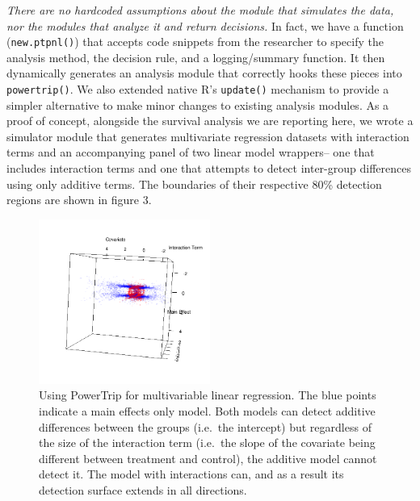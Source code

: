 \documentclass[review, authoryear]{elsarticle}
\begin{document}
\emph{There are no hardcoded assumptions about the module that simulates
the data, nor the modules that analyze it and return decisions.} In
fact, we have a function (\texttt{new.ptpnl()}) that accepts code
snippets from the researcher to specify the analysis method, the
decision rule, and a logging/summary function. It then dynamically
generates an analysis module that correctly hooks these pieces into
\texttt{powertrip()}. We also extended native R's \texttt{update()}
mechanism to provide a simpler alternative to make minor changes to
existing analysis modules. As a proof of concept, alongside the survival
analysis we are reporting here, we wrote a simulator module that
generates multivariate regression datasets with interaction terms and an
accompanying panel of two linear model wrappers-- one that includes
interaction terms and one that attempts to detect inter-group
differences using only additive terms. The boundaries of their
respective 80\% detection regions are shown in figure 3.

\begin{figure}
\centering
\includegraphics[width=0.50000\textwidth]{pt2017_figure03.png}
\caption{Using PowerTrip for multivariable linear regression. The blue
points indicate a main effects only model. Both models can detect
additive differences between the groups (i.e.~the intercept) but
regardless of the size of the interaction term (i.e.~the slope of the
covariate being different between treatment and control), the additive
model cannot detect it. The model with interactions can, and as a result
its detection surface extends in all directions.}
\end{figure}
\end{document}
